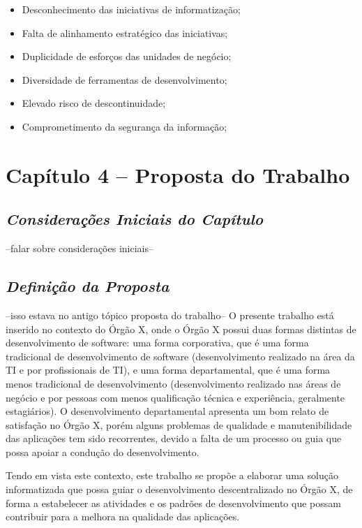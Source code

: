 \begin{itemize}
\item Desconhecimento das iniciativas de informatização;
\item Falta de alinhamento estratégico das iniciativas;
\item Duplicidade de esforços das unidades de negócio;
\item Diversidade de ferramentas de desenvolvimento;
\item Elevado risco de descontinuidade;
\item Comprometimento da segurança da informação;
\end{itemize}

\chapter[Capítulo 4]{Capítulo 4 – Proposta do Trabalho}

\section{\textit{Considerações Iniciais do Capítulo}}

--falar sobre considerações iniciais--

\section{\textit{Definição da Proposta}}

--isso estava no antigo tópico proposta do trabalho--
O presente trabalho está inserido no contexto do Órgão X, onde o Órgão X possui duas formas distintas de desenvolvimento de software: uma forma corporativa, que é uma forma tradicional de desenvolvimento de software (desenvolvimento realizado na área da TI e por profissionais de TI), e uma forma departamental, que é uma forma menos tradicional de desenvolvimento (desenvolvimento realizado nas áreas de negócio e por pessoas com menos qualificação técnica e experiência, geralmente estagiários).
O desenvolvimento departamental apresenta um bom relato de satisfação no Órgão X, porém alguns problemas de qualidade e manutenibilidade das aplicações tem sido recorrentes, devido a falta de um processo ou guia que possa apoiar a condução do desenvolvimento.

Tendo em vista este contexto, este trabalho se propõe a elaborar uma solução informatizada que possa guiar o desenvolvimento descentralizado no Órgão X, de forma a estabelecer as atividades e os padrões de desenvolvimento que possam contribuir para a melhora na qualidade das aplicações.

